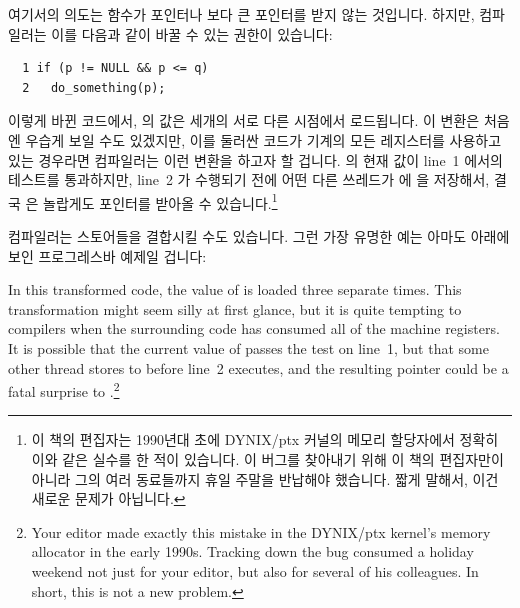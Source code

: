 여기서의 의도는  함수가  포인터나  보다 큰
포인터를 받지 않는 것입니다.
하지만, 컴파일러는 이를 다음과 같이 바꿀 수 있는 권한이 있습니다:

\vspace{5pt}
\begin{minipage}[t]{\columnwidth}
\scriptsize
\begin{verbatim}
  1 if (p != NULL && p <= q)
  2   do_something(p);
\end{verbatim}
\end{minipage}
\vspace{5pt}

이렇게 바뀐 코드에서,  의 값은 세개의 서로 다른 시점에서 로드됩니다.
이 변환은 처음엔 우습게 보일 수도 있겠지만, 이를 둘러싼 코드가 기계의 모든
레지스터를 사용하고 있는 경우라면 컴파일러는 이런 변환을 하고자 할 겁니다.
 의 현재 값이 line~1 에서의 테스트를 통과하지만, line~2 가 수행되기 전에
어떤 다른 쓰레드가  에  을 저장해서, 결국  은
놀랍게도  포인터를 받아올 수 있습니다.\footnote{
	이 책의 편집자는 1990년대 초에 DYNIX/ptx 커널의 메모리 할당자에서
	정확히 이와 같은 실수를 한 적이 있습니다.
	이 버그를 찾아내기 위해 이 책의 편집자만이 아니라 그의 여러 동료들까지
	휴일 주말을 반납해야 했습니다.
	짧게 말해서, 이건 새로운 문제가 아닙니다.}

컴파일러는 스토어들을 결합시킬 수도 있습니다.
그런 가장 유명한 예는 아마도 아래에 보인 프로그레스바 예제일 겁니다:
\iffalse

In this transformed code, the value of  is loaded three
separate times.
This transformation might seem silly at first glance, but it is quite
tempting to compilers when the surrounding code has consumed all of the
machine registers.
It is possible that the current value of  passes the test on
line~1, but that some other thread stores  to  before
line~2 executes, and the resulting  pointer could be a fatal
surprise to .\footnote{
	Your editor made exactly this mistake in the DYNIX/ptx
	kernel's memory allocator in the early 1990s.
	Tracking down the bug consumed a holiday weekend not just
	for your editor, but also for several of his colleagues.
	In short, this is not a new problem.}

